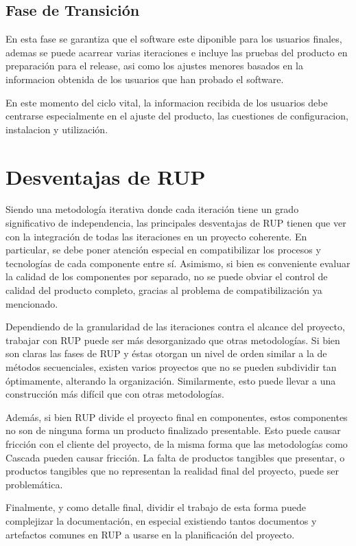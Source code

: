 \documentclass[spanish]{udpreport}
\begin{document}
\subsection{Fase de Transición}
En esta fase se garantiza que el software este diponible para los usuarios finales, ademas se puede acarrear varias iteraciones e incluye las pruebas del producto en preparación para el release, asi como los ajustes menores basados en la informacion obtenida de los usuarios que han probado el software.\par
En este momento del ciclo vital, la informacion recibida de los usuarios debe centrarse especialmente en el ajuste del producto, las cuestiones de configuracion, instalacion y utilización.

\section{Desventajas de RUP}
Siendo una metodología iterativa donde cada iteración tiene un grado significativo de independencia, las principales desventajas de RUP tienen que ver con la integración de todas las iteraciones en un proyecto coherente. En particular, se debe poner atención especial en compatibilizar los procesos y tecnologías de cada componente entre sí. Asimismo, si bien es conveniente evaluar la calidad de los componentes por separado, no se puede obviar el control de calidad del producto completo, gracias al problema de compatibilización ya mencionado.\par
Dependiendo de la granularidad de las iteraciones contra el alcance del proyecto, trabajar con RUP puede ser más desorganizado que otras metodologías. Si bien son claras las fases de RUP y éstas otorgan un nivel de orden similar a la de métodos secuenciales, existen varios proyectos que no se pueden subdividir tan óptimamente, alterando la organización. Similarmente, esto puede llevar a una construcción más difícil que con otras metodologías.\par
Además, si bien RUP divide el proyecto final en componentes, estos componentes no son de ninguna forma un producto finalizado presentable. Esto puede causar fricción con el cliente del proyecto, de la misma forma que las metodologías como Cascada pueden causar fricción. La falta de productos tangibles que presentar, o productos tangibles que no representan la realidad final del proyecto, puede ser problemática.\par
Finalmente, y como detalle final, dividir el trabajo de esta forma puede complejizar la documentación, en especial existiendo tantos documentos y artefactos comunes en RUP a usarse en la planificación del proyecto.
\end{document}
